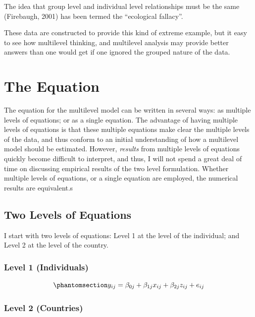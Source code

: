 \documentclass[
  letterpaper,
  DIV=11,
  numbers=noendperiod]{scrreprt}
\begin{document}
The idea that group level and individual level relationships must be the
same (Firebaugh, 2001) has been termed the ``ecological fallacy''.

These data are constructed to provide this kind of extreme example, but
it easy to see how multilevel thinking, and multilevel analysis may
provide better answers than one would get if one ignored the grouped
nature of the data.

\section{The Equation}\label{the-equation}

The equation for the multilevel model can be written in several ways: as
multiple levels of equations; or as a single equation. The advantage of
having multiple levels of equations is that these multiple equations
make clear the multiple levels of the data, and thus conform to an
initial understanding of how a multilevel model should be estimated.
However, \emph{results} from multiple levels of equations quickly become
difficult to interpret, and thus, I will not spend a great deal of time
on discussing empirical results of the two level formulation. Whether
multiple levels of equations, or a single equation are employed, the
numerical results are equivalent.s

\subsection{Two Levels of Equations}\label{two-levels-of-equations}

I start with two levels of equations: Level 1 at the level of the
individual; and Level 2 at the level of the country.

\subsubsection{Level 1 (Individuals)}\label{level-1-individuals}

\begin{equation}\phantomsection\label{eq-MLM1}{y_{ij} = \beta_{0j} + \beta_{1j} x_{ij} + \beta_{2j} z_{ij} + e_{ij}}\end{equation}

\subsubsection{Level 2 (Countries)}\label{level-2-countries}
\end{document}
